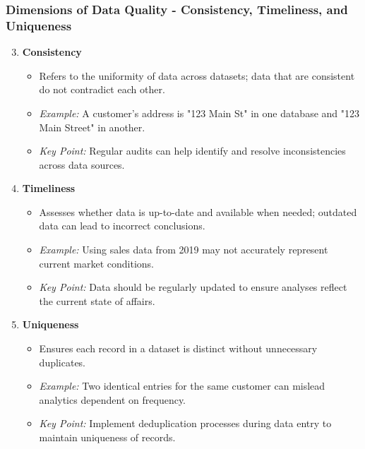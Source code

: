 \documentclass[aspectratio=169]{beamer}
\begin{document}
\begin{frame}[fragile]
    \frametitle{Dimensions of Data Quality - Consistency, Timeliness, and Uniqueness}
    \begin{enumerate}
        \setcounter{enumi}{2}
        \item \textbf{Consistency}
        \begin{itemize}
            \item Refers to the uniformity of data across datasets; data that are consistent do not contradict each other.
            \item \textit{Example:} A customer's address is "123 Main St" in one database and "123 Main Street" in another.
            \item \textit{Key Point:} Regular audits can help identify and resolve inconsistencies across data sources.
        \end{itemize}
        
        \item \textbf{Timeliness}
        \begin{itemize}
            \item Assesses whether data is up-to-date and available when needed; outdated data can lead to incorrect conclusions.
            \item \textit{Example:} Using sales data from 2019 may not accurately represent current market conditions.
            \item \textit{Key Point:} Data should be regularly updated to ensure analyses reflect the current state of affairs.
        \end{itemize}

        \item \textbf{Uniqueness}
        \begin{itemize}
            \item Ensures each record in a dataset is distinct without unnecessary duplicates.
            \item \textit{Example:} Two identical entries for the same customer can mislead analytics dependent on frequency.
            \item \textit{Key Point:} Implement deduplication processes during data entry to maintain uniqueness of records.
        \end{itemize}
    \end{enumerate}
\end{frame}
\end{document}
